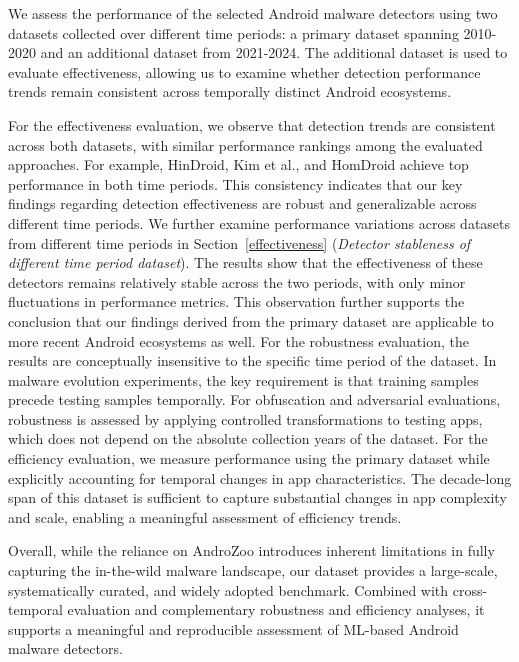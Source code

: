 We assess the performance of the selected Android malware detectors using two datasets collected over different time periods: a primary dataset spanning 2010-2020 and an additional dataset from 2021-2024. The additional dataset is used to evaluate effectiveness, allowing us to examine whether detection performance trends remain consistent across temporally distinct Android ecosystems.

For the effectiveness evaluation, we observe that detection trends are consistent across both datasets, with similar performance rankings among the evaluated approaches. For example, HinDroid, Kim et al., and HomDroid achieve top performance in both time periods. This consistency indicates that our key findings regarding detection effectiveness are robust and generalizable across different time periods.
We further examine performance variations across datasets from different time periods in Section~\ref{effectiveness} (\textit{Detector stableness of different time period dataset}). The results show that the effectiveness of these detectors remains relatively stable across the two periods, with only minor fluctuations in performance metrics. This observation further supports the conclusion that our findings derived from the primary dataset are applicable to more recent Android ecosystems as well.
For the robustness evaluation, the results are conceptually insensitive to the specific time period of the dataset. In malware evolution experiments, the key requirement is that training samples precede testing samples temporally. For obfuscation and adversarial evaluations, robustness is assessed by applying controlled transformations to testing apps, which does not depend on the absolute collection years of the dataset.
For the efficiency evaluation, we measure performance using the primary dataset while explicitly accounting for temporal changes in app characteristics. The decade-long span of this dataset is sufficient to capture substantial changes in app complexity and scale, enabling a meaningful assessment of efficiency trends.

Overall, while the reliance on AndroZoo introduces inherent limitations in fully capturing the in-the-wild malware landscape, our dataset provides a large-scale, systematically curated, and widely adopted benchmark. 
Combined with cross-temporal evaluation and complementary robustness and efficiency analyses, it supports a meaningful and reproducible assessment of ML-based Android malware detectors.


